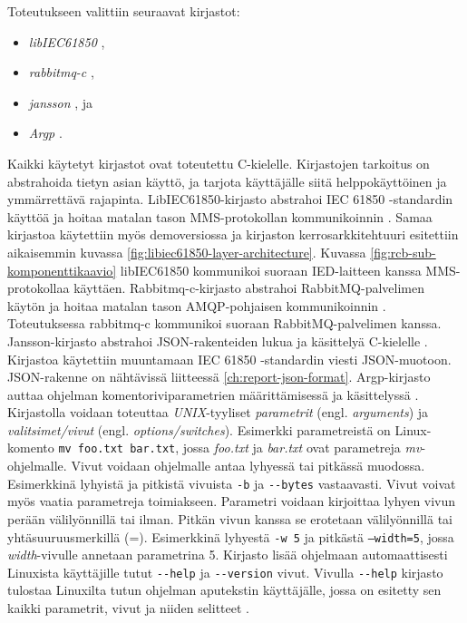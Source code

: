 Toteutukseen valittiin seuraavat kirjastot:
\begin{itemize}
	\item \emph{libIEC61850} \cite{libIEC61850-repo},
	\item \emph{rabbitmq-c} \cite{rabbitmq-c-repo},
	\item \emph{jansson} \cite{jansson-repo}, ja
	\item \emph{Argp} \cite{argp-glibc-guide}.
\end{itemize}
Kaikki käytetyt kirjastot ovat toteutettu C-kielelle. Kirjastojen tarkoitus on abstrahoida tietyn asian käyttö, ja tarjota käyttäjälle siitä helppokäyttöinen ja ymmärrettävä rajapinta. LibIEC61850-kirjasto abstrahoi IEC 61850 -standardin käyttöä ja hoitaa matalan tason MMS-protokollan kommunikoinnin \cite{libIEC61850-repo}. Samaa kirjastoa käytettiin myös demoversiossa ja kirjaston kerrosarkkitehtuuri esitettiin aikaisemmin kuvassa \ref{fig:libiec61850-layer-architecture}. Kuvassa \ref{fig:rcb-sub-komponenttikaavio} libIEC61850 kommunikoi suoraan IED-laitteen kanssa MMS-protokollaa käyttäen. Rabbitmq-c-kirjasto abstrahoi RabbitMQ-palvelimen käytön ja hoitaa matalan tason AMQP-pohjaisen kommunikoinnin \cite{rabbitmq-c-repo}. Toteutuksessa rabbitmq-c kommunikoi suoraan RabbitMQ-palvelimen kanssa. Jansson-kirjasto abstrahoi JSON-rakenteiden lukua ja käsittelyä C-kielelle \cite{jansson-repo}. Kirjastoa käytettiin muuntamaan IEC 61850 -standardin viesti JSON-muotoon. JSON-rakenne on nähtävissä liitteessä \ref{ch:report-json-format}. Argp-kirjasto auttaa ohjelman komentoriviparametrien määrittämisessä ja käsittelyssä \cite{argp-glibc-guide}. Kirjastolla voidaan toteuttaa \emph{UNIX}-tyyliset \emph{parametrit} (engl. \emph{arguments}) ja \emph{valitsimet/vivut} (engl. \emph{options/switches}). Esimerkki parametreistä on Linux-komento \texttt{mv foo.txt bar.txt}, jossa \emph{foo.txt} ja \emph{bar.txt} ovat parametreja \emph{mv}-ohjelmalle. Vivut voidaan ohjelmalle antaa lyhyessä tai pitkässä muodossa. Esimerkkinä lyhyistä ja pitkistä vivuista \texttt{-b} ja \texttt{-{}-bytes} vastaavasti. Vivut voivat myös vaatia parametreja toimiakseen. Parametri voidaan kirjoittaa lyhyen vivun perään välilyönnillä tai ilman. Pitkän vivun kanssa se erotetaan välilyönnillä tai yhtäsuuruusmerkillä (=). Esimerkkinä lyhyestä \texttt{-w 5} ja pitkästä \texttt{--width=5}, jossa \emph{width}-vivulle annetaan parametrina 5. Kirjasto lisää ohjelmaan automaattisesti Linuxista käyttäjille tutut \texttt{-{}-help} ja \texttt{-{}-version} vivut. Vivulla \texttt{-{}-help} kirjasto tulostaa Linuxilta tutun ohjelman aputekstin käyttäjälle, jossa on esitetty sen kaikki parametrit, vivut ja niiden selitteet \cite{step-by-step-into-argp}.

